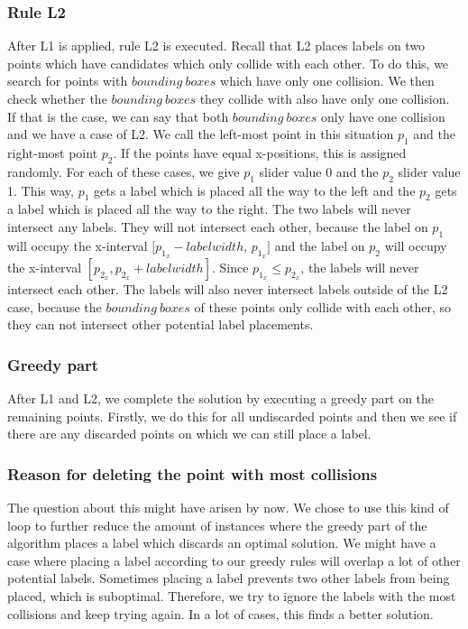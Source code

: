 \documentclass[crop=false,a4paper,oneside,11pt]{article}
\begin{document}
\subsubsection{Rule L2}
After L1 is applied, rule L2 is executed. Recall that L2 places labels on two points which have candidates which only collide with each other. To do this, we search for points with $bounding \ boxes$ which have only one collision. We then check whether the $bounding \ boxes$ they collide with also have only one collision. If that is the case, we can say that both $bounding \ boxes$ only have one collision and we have a case of L2. We call the left-most point in this situation $p_1$ and the right-most point $p_2$. If the points have equal x-positions, this is assigned randomly. For each of these cases, we give $p_1$ slider value 0 and the $p_2$ slider value 1. This way, $p_1$ gets a label which is placed all the way to the left and the $p_2$ gets a label which is placed all the way to the right. The two labels will never intersect any labels. They will not intersect each other, because the label on $p_1$ will occupy the x-interval $[p_{1_x} - labelwidth$, $p_{1_x}]$ and the label on $p_2$ will occupy the x-interval $[p_{2_x}, p_{2_x} + labelwidth]$. Since $p_{1_x} \leq p_{2_x}$, the labels will never intersect each other. The labels will also never intersect labels outside of the L2 case, because the $bounding \ boxes$ of these points only collide with each other, so they can not intersect other potential label placements.
\subsubsection{Greedy part}
After L1 and L2, we complete the solution by executing a greedy part on the remaining points. Firstly, we do this for all undiscarded points and then we see if there are any discarded points on which we can still place a label.

\subsubsection{Reason for deleting the point with most collisions}
The question about this might have arisen by now. We chose to use this kind of loop to further reduce the amount of instances where the greedy part of the algorithm places a label which discards an optimal solution. We might have a case where placing a label according to our greedy rules will overlap a lot of other potential labels. Sometimes placing a label prevents two other labels from being placed, which is suboptimal. Therefore, we try to ignore the labels with the most collisions and keep trying again. In a lot of cases, this finds a better solution.
\end{document}
